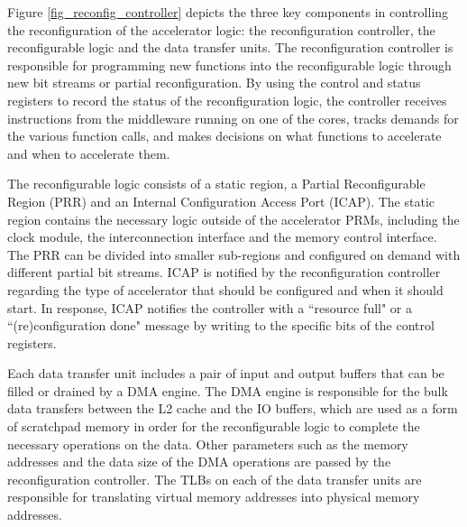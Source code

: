 Figure \ref{fig_reconfig_controller} depicts the three key components
in controlling the reconfiguration of the accelerator logic:
the reconfiguration controller, the reconfigurable logic and the data transfer
units. The reconfiguration controller is responsible for programming
new functions into the reconfigurable logic through new bit streams or
partial reconfiguration. By using the control and status registers to record the
status of the reconfiguration logic, the controller receives
instructions from the middleware running on one of the cores, tracks
demands for the various function calls, and makes decisions on what functions to accelerate and
when to accelerate them.

The reconfigurable logic consists of a static region, a Partial
Reconfigurable Region (PRR) and an Internal Configuration Access Port
(ICAP). The static region contains the necessary logic outside of the
accelerator PRMs, including the clock module, the interconnection interface and the
memory control interface. The PRR can be divided into smaller
sub-regions and configured on demand with different partial bit streams. ICAP is notified by the reconfiguration controller regarding
the type of accelerator 
that should be configured and when it should start. In response, ICAP notifies
the controller with a ``resource full" or a ``(re)configuration done" message by
writing to the specific bits of the control registers.

Each data transfer unit includes a pair of input and output buffers
that can be filled or drained by a DMA engine. The DMA engine is
responsible for the bulk data transfers between the L2 cache and the
IO buffers, which are used as a form of scratchpad memory in order for the
reconfigurable logic to complete the necessary operations on the data. Other
parameters such as the memory addresses and the data size of the DMA
operations are passed by the reconfiguration controller. The TLBs on each
of the data transfer units are responsible for translating virtual
memory addresses into physical memory addresses.


